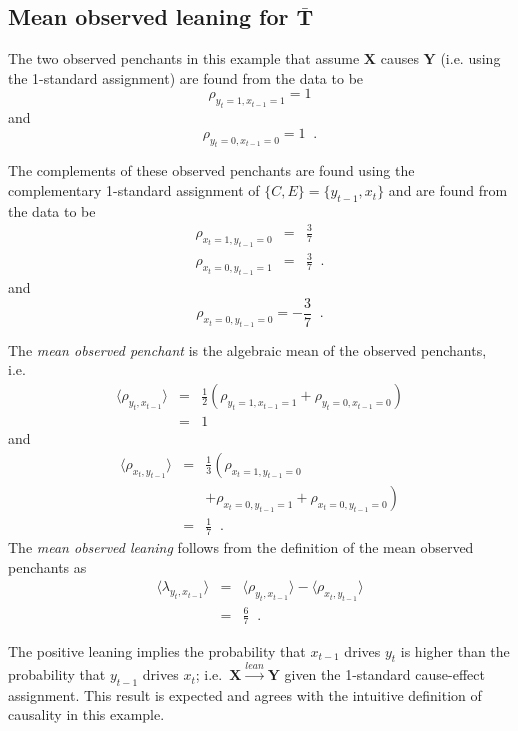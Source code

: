 \documentclass[a4paper,11pt,twocolumn]{article}
\begin{document}
\subsection{Mean observed leaning for $\bar{\mathbf{T}}$}
The two observed penchants in this example that assume $\mathbf{X}$ causes $\mathbf{Y}$ (i.e. using the 1-standard assignment) are found from the data to be
\begin{equation}
\label{eqn:rhoex1}
\rho_{y_t=1,x_{t-1}=1}=1
\end{equation}
and
\begin{equation}
\rho_{y_t=0,x_{t-1}=0}=1\;\;.
\end{equation}

The complements of these observed penchants are found using the complementary 1-standard assignment of $\{C,E\}=\{y_{t-1},x_t\}$ and are found from the data to be
\begin{eqnarray}
\rho_{x_t=1,y_{t-1}=0} &=& \frac{3}{7}\\
\rho_{x_t=0,y_{t-1}=1} &=& \frac{3}{7}\;\;.
\end{eqnarray}
and
\begin{equation}
\rho_{x_t=0,y_{t-1}=0}=-\frac{3}{7}\;\;.
\end{equation}

The {\em mean observed penchant} is the algebraic mean of the observed penchants, i.e.\
\begin{eqnarray*}
\langle \rho_{y_t,x_{t-1}} \rangle &=& \frac{1}{2}\left(\rho_{y_t=1,x_{t-1}=1} + \rho_{y_t=0,x_{t-1}=0}\right)\\
&=& 1
\end{eqnarray*}
and
\begin{eqnarray*}
\langle \rho_{x_t,y_{t-1}} \rangle &=& \frac{1}{3}\left(\rho_{x_t=1,y_{t-1}=0} \right.\\
& &\left. +\rho_{x_t=0,y_{t-1}=1} + \rho_{x_t=0,y_{t-1}=0}\right)\\
&=& \frac{1}{7}\;\;.
\end{eqnarray*}
The {\em mean observed leaning} follows from the definition of the mean observed penchants as
\begin{eqnarray}
\label{eqn:meanlean}
\langle \lambda_{y_t,x_{t-1}} \rangle &=& \langle \rho_{y_t,x_{t-1}} \rangle - \langle \rho_{x_t,y_{t-1}} \rangle\\
&=& \frac{6}{7}\;\;.
\end{eqnarray}

The positive leaning implies the probability that $x_{t-1}$ drives $y_t$ is higher than the probability that $y_{t-1}$ drives $x_{t}$; i.e.\ $\mathbf{X}\xrightarrow{lean}\mathbf{Y}$ given the 1-standard cause-effect assignment.  This result is expected and agrees with the intuitive definition of causality in this example.  
\end{document}
